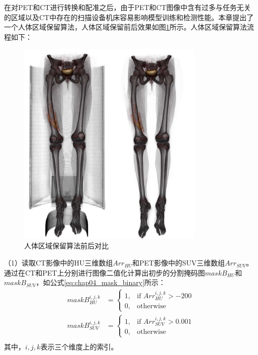 在对PET和CT进行转换和配准之后，由于PET和CT图像中含有过多与任务无关的区域以及CT中存在的扫描设备机床容易影响模型训练和检测性能。本章提出了一个人体区域保留算法，人体区域保留前后效果如图\ref{fig:chap04_body_retent}所示。人体区域保留算法流程如下：

\begin{figure}[htbp]
  \centering
  \includegraphics[width=0.8\textwidth]{figures/chap04_body_retent.jpg}
  \caption{人体区域保留算法前后对比}
  \label{fig:chap04_body_retent}
\end{figure}

（1）读取CT影像中的HU三维数组\(Arr_{HU}\)和PET影像中的SUV三维数组\(Arr_{SUV}\)。通过在CT和PET上分别进行图像二值化计算出初步的分割掩码图\(maskB_{HU}\)和\(maskB_{SUV}\)，如公式\ref{eq:chap04_mask_binary}所示：
\begin{equation}
  \begin{aligned}
    maskB_{HU}^{i, j, k}  & =
    \begin{cases}
      1 , & \text{if \(Arr_{HU}^{i, j, k} > -200\)} \\
      0 , & \text{otherwise}
    \end{cases}  \\
    maskB_{SUV}^{i, j, k} & =
    \begin{cases}
      1 , & \text{if \(Arr_{SUV}^{i, j, k} > 0.001\)} \\
      0 , & \text{otherwise}
    \end{cases} \\
  \end{aligned}
  \label{eq:chap04_mask_binary}
\end{equation}
其中，\(i,j,k\)表示三个维度上的索引。

